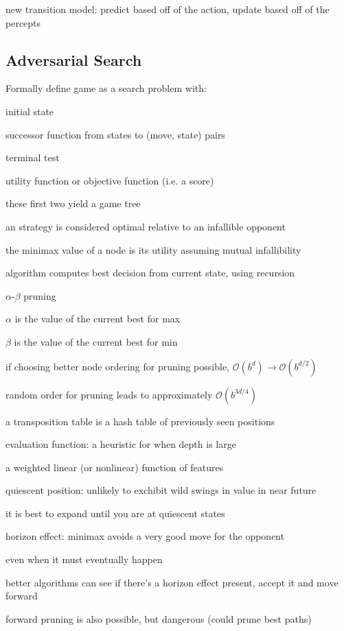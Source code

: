 \documentclass[12pt]{article}
\begin{document}
new transition model: predict based off of the action, update based off of the percepts

\subsection{Adversarial Search}

\noindent
Formally define game as a search problem with:

initial state

successor function from states to (move, state) pairs

terminal test

utility function or objective function (i.e. a score)

these first two yield a game tree

\noindent
an strategy is considered optimal relative to an infallible opponent

\noindent
the minimax value of a node is its utility assuming mutual infallibility

algorithm computes best decision from current state, using recursion

\noindent
$\alpha$-$\beta$ pruning

$\alpha$ is the value of the current best for max

$\beta$ is the value of the current best for min

if choosing better node ordering for pruning possible, $\mathcal{O}(b^d) \to \mathcal{O}(b^{d/2})$

random order for pruning leads to approximately $\mathcal{O}(b^{3d/4})$

a transposition table is a hash table of previously seen positions

\noindent
evaluation function: a heuristic for when depth is large

a weighted linear (or nonlinear) function of features

quiescent position: unlikely to exchibit wild swings in value in near future

it is best to expand until you are at quiescent states

horizon effect: minimax avoids a very good move for the opponent

even when it must eventually happen

better algorithms can see if there's a horizon effect present, accept it and move forward

forward pruning is also possible, but dangerous (could prune best paths)
\end{document}
